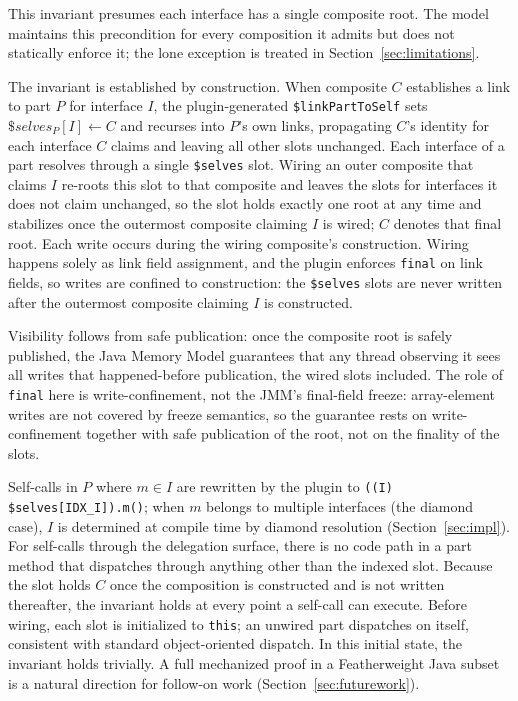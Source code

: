 \documentclass[sigplan,10pt,review,anonymous]{acmart}
\theoremstyle{acmplain}
\newcommand{\code}[1]{\texttt{#1}}
\begin{document}
This invariant presumes each interface has a single composite root. The model
maintains this precondition for every composition it admits but does not
statically enforce it; the lone exception is treated in
Section~\ref{sec:limitations}.

The invariant is established by construction. When composite $C$ establishes
a link to part $P$ for interface $I$, the plugin-generated
\code{\$linkPartToSelf} sets $\$\mathit{selves}_P[I] \leftarrow C$ and
recurses into $P$'s own links, propagating $C$'s identity for each interface
$C$ claims and leaving all other slots unchanged. Each interface of a part resolves
through a single \code{\$selves} slot. Wiring an outer composite that claims
$I$ re-roots this slot to that composite and leaves the slots for interfaces it
does not claim unchanged, so the slot holds exactly one root at any time and
stabilizes once the outermost composite claiming $I$ is wired; $C$ denotes that
final root. Each write occurs during the wiring composite's construction. Wiring happens solely
as link field assignment, and the plugin enforces \code{final} on link
fields, so writes are confined to construction: the \code{\$selves} slots are never
written after the outermost composite claiming $I$ is constructed.

Visibility follows from safe publication: once the composite root is safely published, the
Java Memory Model guarantees that any thread observing it sees all writes that
happened-before publication, the wired slots included. The role of \code{final}
here is write-confinement, not the JMM's final-field freeze: array-element writes
are not covered by freeze semantics, so the guarantee rests on write-confinement
together with safe publication of the root, not on the finality of the slots.

Self-calls in $P$ where $m \in I$ are rewritten by
the plugin to \code{((I)\,\$selves[IDX\_I]).m()}; when $m$ belongs to multiple
interfaces (the diamond case), $I$ is determined at compile time by diamond
resolution (Section~\ref{sec:impl}). For self-calls through the delegation surface, there is no code path in a
part method that dispatches through anything other than the indexed
slot. Because the slot holds $C$ once the composition is constructed and is not
written thereafter, the invariant holds at every point a self-call can execute.
Before wiring, each slot is initialized to \code{this}; an unwired part
dispatches on itself, consistent with standard object-oriented dispatch. In this
initial state, the invariant holds trivially.
A full mechanized proof in a Featherweight Java subset is a natural direction
for follow-on work (Section~\ref{sec:futurework}).
\end{document}
